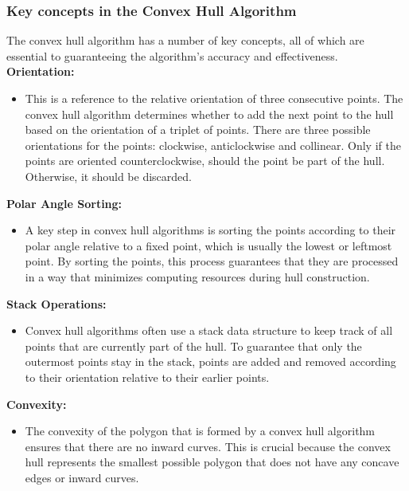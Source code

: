     \subsubsection{Key concepts in the Convex Hull Algorithm}
    The convex hull algorithm has a number of key concepts, all of which are essential to guaranteeing the algorithm's accuracy and effectiveness. \newline \newline
    \textbf{Orientation:}
    \begin{itemize}
        \item This is a reference to the relative orientation of three consecutive points. The convex hull algorithm determines whether to add the next point to the hull based on the orientation of a triplet of points. There are three possible orientations for the points: clockwise, anticlockwise and collinear. Only if the points are oriented counterclockwise, should the point be part of the hull. Otherwise, it should be discarded.
    \end{itemize}

    \textbf{Polar Angle Sorting:}
    \begin{itemize}
        \item A key step in convex hull algorithms is sorting the points according to their polar angle relative to a fixed point, which is usually the lowest or leftmost point. By sorting the points, this process guarantees that they are processed in a way that minimizes computing resources during hull construction.
    \end{itemize}

    \textbf{Stack Operations:}
    \begin{itemize}
        \item Convex hull algorithms often use a stack data structure to keep track of all points that are currently part of the hull. To guarantee that only the outermost points stay in the stack, points are added and removed according to their orientation relative to their earlier points.
    \end{itemize}

    \textbf{Convexity:}
    \begin{itemize}
        \item The convexity of the polygon that is formed by a convex hull algorithm ensures that there are no inward curves. This is crucial because the convex hull represents the smallest possible polygon that does not have any concave edges or inward curves.
    \end{itemize} \autocite{Andi:keyConcepts}

